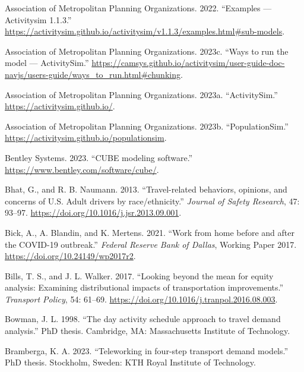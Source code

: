 \documentclass[fancy, twoside, mastersfancy, ms]{byuthesis}
\newlength{\cslhangindent}
\newenvironment{CSLReferences}[2] %
 {\begin{list}{}{%
  \setlength{\itemindent}{0pt}
  \setlength{\leftmargin}{0pt}
  \setlength{\parsep}{0pt}
  \ifodd #1
   \setlength{\leftmargin}{\cslhangindent}
   \setlength{\itemindent}{-1\cslhangindent}
  \fi
  \setlength{\itemsep}{#2\baselineskip}}}
 {\end{list}}
\begin{document}
\label{refs}
\begin{CSLReferences}{1}{0}
Association of Metropolitan Planning Organizations. 2022. {``Examples
--- {Activitysim} 1.1.3.''}
\url{https://activitysim.github.io/activitysim/v1.1.3/examples.html\#sub-models}.

Association of Metropolitan Planning Organizations. 2023c. {``Ways to
run the model --- {ActivitySim}.''}
\url{https://camsys.github.io/activitysim/user-guide-doc-navjs/users-guide/ways\_to\_run.html\#chunking}.

Association of Metropolitan Planning Organizations. 2023a.
{``{ActivitySim}.''} \url{https://activitysim.github.io/}.

Association of Metropolitan Planning Organizations. 2023b.
{``{PopulationSim}.''} \url{https://activitysim.github.io/populationsim}.

Bentley Systems. 2023. {``{CUBE} modeling software.''}
\url{https://www.bentley.com/software/cube/}.

Bhat, G., and R. B. Naumann. 2013. {``Travel-related behaviors,
opinions, and concerns of {U}.{S}. Adult drivers by race/ethnicity.''}
\emph{Journal of Safety Research}, 47: 93--97.
\url{https://doi.org/10.1016/j.jsr.2013.09.001}.

Bick, A., A. Blandin, and K. Mertens. 2021. {``Work from home before and
after the {COVID-19} outbreak.''} \emph{Federal Reserve Bank of Dallas},
Working Paper 2017. \url{https://doi.org/10.24149/wp2017r2}.

Bills, T. S., and J. L. Walker. 2017. {``Looking beyond the mean for
equity analysis: Examining distributional impacts of transportation
improvements.''} \emph{Transport Policy}, 54: 61--69.
\url{https://doi.org/10.1016/j.tranpol.2016.08.003}.

Bowman, J. L. 1998. {``The day activity schedule approach to travel
demand analysis.''} PhD thesis. Cambridge, MA: Massachusetts Institute
of Technology.

Bramberga, K. A. 2023. {``Teleworking in four-step transport demand
models.''} PhD thesis. Stockholm, Sweden: KTH Royal Institute of
Technology.


\end{CSLReferences}
\end{document}
